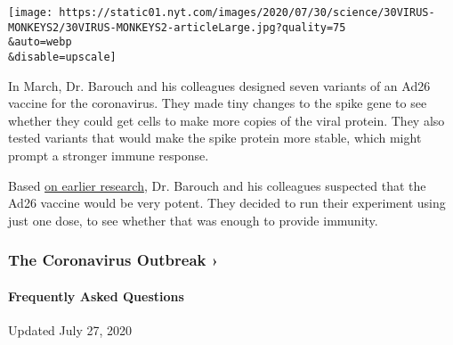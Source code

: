 \texttt{[image: https://static01.nyt.com/images/2020/07/30/science/30VIRUS-MONKEYS2/30VIRUS-MONKEYS2-articleLarge.jpg?quality=75\\\&auto=webp\\\&disable=upscale]}

In March, Dr. Barouch and his colleagues designed seven variants of an
Ad26 vaccine for the coronavirus. They made tiny changes to the spike
gene to see whether they could get cells to make more copies of the
viral protein. They also tested variants that would make the spike
protein more stable, which might prompt a stronger immune response.

Based
\href{https://www.nytimes.com/2020/05/20/health/coronavirus-vaccine-harvard.html}{on
earlier research}, Dr. Barouch and his colleagues suspected that the
Ad26 vaccine would be very potent. They decided to run their experiment
using just one dose, to see whether that was enough to provide immunity.

\href{https://www.nytimes.com/news-event/coronavirus?action=click\&pgtype=Article\&state=default\&region=MAIN_CONTENT_3\&context=storylines_faq}{}

\hypertarget{the-coronavirus-outbreak-}{%
\subsubsection{The Coronavirus Outbreak
›}\label{the-coronavirus-outbreak-}}

\hypertarget{frequently-asked-questions}{%
\paragraph{Frequently Asked
Questions}\label{frequently-asked-questions}}

Updated July 27, 2020

